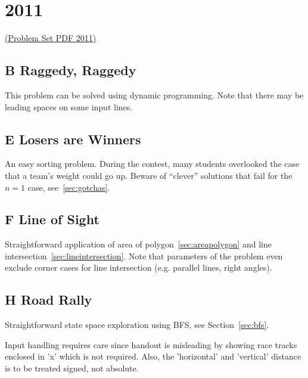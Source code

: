 
\section{2011}

\href{http://midatl.radford.edu/docs/pastProblems/11contest/MidAtlantic2011.pdf}{(Problem Set PDF 2011)}

\subsection{B Raggedy, Raggedy}
\label{sec:2011-b-raggedy}

This problem can be solved using dynamic programming.
Note that there may be leading spaces on some input lines.

\subsection{E Losers are Winners}
\label{sec:2011-e-losers}

An easy sorting problem.
During the contest, many students overlooked the case that a team's weight could go up.
Beware of ``clever'' solutions that fail for the $n=1$ case, see~\ref{sec:gotchas}.

\subsection{F Line of Sight}
\label{sec:2011-f-lineofsight}

Straightforward application of area of polygon~\ref{sec:areapolygon} and line intersection~\ref{sec:lineintersection}.
Note that parameters of the problem even exclude corner cases for line intersection (e.g. parallel lines, right angles).

\subsection{H Road Rally}
\label{sec:2011-h-rally}

Straightforward state space exploration using BFS, see Section~\ref{sec:bfs}.

Input handling requires care since handout is misleading by showing race tracks enclosed in 'x' which is not
required.  Also, the 'horizontal' and 'vertical' distance is to be treated signed, not absolute.

